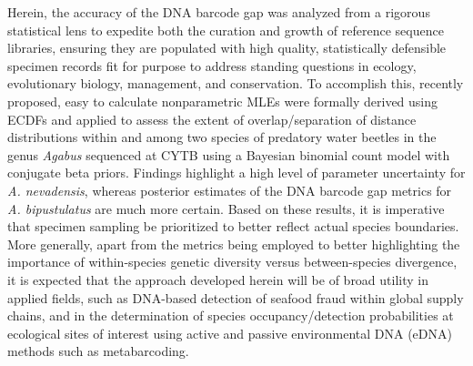 \documentclass[12pt]{article}
\begin{document}
Herein, the accuracy of the DNA barcode gap was analyzed from a rigorous statistical lens to expedite both the curation and growth of reference sequence libraries, ensuring they are populated with high quality, statistically defensible specimen records fit for purpose to address standing questions in ecology, evolutionary biology, management, and conservation. To accomplish this, recently proposed, easy to calculate nonparametric MLEs were formally derived using ECDFs and applied to assess the extent of overlap/separation of distance distributions within and among two species of predatory water beetles in the genus \textit{Agabus} sequenced at CYTB using a Bayesian binomial count model with conjugate beta priors. Findings highlight a high level of parameter uncertainty for \textit{A. nevadensis}, whereas posterior estimates of the DNA barcode gap metrics for \textit{A. bipustulatus} are much more certain. Based on these results, it is imperative that specimen sampling be prioritized to better reflect actual species boundaries. More generally, apart from the metrics being employed to better highlighting the importance of within-species genetic diversity versus between-species divergence, it is expected that the approach developed herein will be of broad utility in applied fields, such as DNA-based detection of seafood fraud within global supply chains, and in the determination of species occupancy/detection probabilities at ecological sites of interest using active and passive environmental DNA (eDNA) methods such as metabarcoding.
\end{document}

